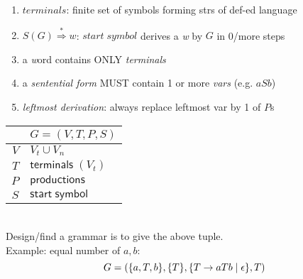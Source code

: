 \begin{minipage}{0.45\linewidth}
\begin{enumerate}
\item \(terminals\): finite set of symbols forming strs of def-ed language
\item \(S(G) \overset{*}{\Rightarrow} w\): \(start\; symbol\) derives a \emph{w} by \(G\) in 0/more steps
\item a \emph{w}ord contains ONLY \emph{terminals}
\item a \emph{sentential form} MUST contain 1 or more \emph{vars} (e.g. \(aSb\))
\item \emph{leftmost derivation}: always replace leftmost var by 1 of \(P\)s
\end{enumerate}
\end{minipage}
{\footnotesize
\begin{minipage}{0.5\linewidth}
  \centering
  \begin{tabular}{r|l}
    & $G = (V,T,P,S)$  \\
    \hline
    $V$ & $V_{t} \cup V_{n}$ \\
    $T$ & $\mathsf{terminals} \; (V_{t})$\\
    $P$ & $\mathsf{productions}$ \\
    $S$ & $\mathsf{start \; symbol}$\\
    \hline
\end{tabular}\\
Design/find a grammar is to give the above tuple.\\
Example: equal number of \(a, b\):
\[
  G = (\{a,T,b\},\{T\},\{T \rightarrow aTb \;|\; \epsilon\},T)
\]

\end{minipage}
}
